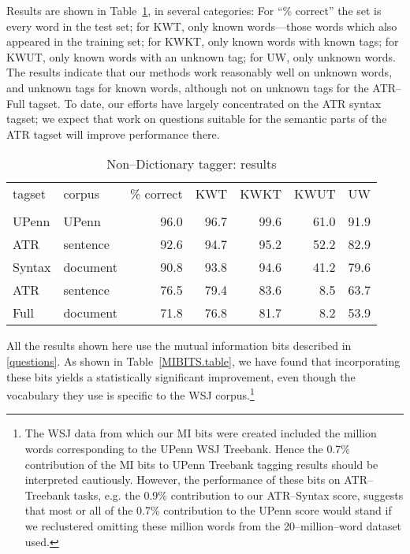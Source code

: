 Results are shown in Table~\ref{tagging.table}, in several categories:
For ``\% correct'' the set is every word in the test set; for KWT,
only known words---those words which also appeared in the training
set; for KWKT, only known words with known tags; for KWUT, only known
words with an unknown tag; for UW, only unknown words.  The results
indicate that our methods work reasonably well on unknown words, and
unknown tags for known words, although not on unknown tags for the
ATR--Full tagset.  To date, our efforts have largely concentrated on
the ATR syntax tagset; we expect that work on questions suitable for
the semantic parts of the ATR tagset will improve performance there.

\begin{table}
\begin{center}
\caption{Non--Dictionary tagger: results}
\renewcommand{\arraystretch}{}
\begin{tabular}{||l|l|*{5}{r|}|}
\hline
tagset      & corpus     & \% correct  & KWT  & KWKT & KWUT & UW          \\
            &            &             &      &      &      &             \\ \hline
UPenn       & UPenn      & 96.0        & 96.7 & 99.6 & 61.0 & 91.9        \\ \hline

ATR         & sentence   & 92.6        & 94.7 & 95.2 & 52.2 & 82.9        \\ \cline{2-7}
Syntax      & document   & 90.8        & 93.8 & 94.6 & 41.2 & 79.6        \\ \hline

ATR         & sentence   & 76.5        & 79.4 & 83.6 & 8.5  & 63.7        \\ \cline{2-7}
Full        & document   & 71.8        & 76.8 & 81.7 & 8.2  & 53.9        \\ \hline
\end{tabular}
\renewcommand{\arraystretch}{}
\label{tagging.table}
\end{center}
\end{table}

All the results shown here use the mutual information bits described
in \ref{questions}.  As shown in Table~\ref{MIBITS.table}, we have
found that incorporating these bits yields a statistically significant
improvement, even though the vocabulary they use is specific to the
WSJ corpus.\footnote{The WSJ data from which our MI bits were created
included the million words corresponding to the UPenn WSJ Treebank. 
Hence the 0.7\% contribution of the MI bits to UPenn Treebank tagging
results should be interpreted cautiously. However, the performance of
these bits on ATR--Treebank tasks, e.g. the 0.9\% contribution to our
ATR--Syntax score, suggests that most or all of the 0.7\% contribution
to the UPenn score would stand if we reclustered omitting these
million words from the 20--million--word dataset used.}

